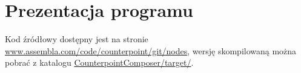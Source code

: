 \documentclass{beamer}
\begin{document}
\section{Prezentacja programu}
\begin{frame}
 Kod źródłowy dostępny jest na stronie
\\
\url{www.assembla.com/code/counterpoint/git/nodes},
 wersję skompilowaną można pobrać z katalogu \url{CounterpointComposer/target/}.
\end{frame}
\end{document}
